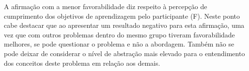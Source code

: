 A afirmação com a menor favorabilidade diz respeito
à percepção de cumprimento dos objetivos de aprendizagem
pelo participante (F).
Neste ponto cabe destacar que ao apresentar um resultado
negativo para esta afirmação, uma vez que com outros
problemas dentro do mesmo grupo tiveram favorabilidade
melhores, se pode questionar o problema e não
a abordagem.
Também não se pode deixar de considerar o nível de abstração
mais elevado para o entendimento dos conceitos deste
problema em relação aos demais.

